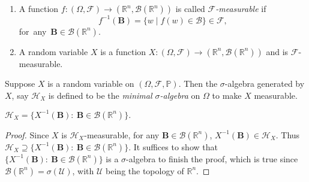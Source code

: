 \begin{definition}
\begin{enumerate}
\item
A function $f:(\Omega,\mathcal{F})\to(\mathbb{R}^n,\mathcal{B}(\mathbb{R}^n))$ is called \emph{$\mathcal{F}$-measurable} if
\[
f^{-1}(\bm B)=\{w\mid f(w)\in\mathcal{B}\}\in\mathcal{F},
\]
\mbox{for any $\bm B\in\mathcal{B}(\mathbb{R}^n)$.}
\item
A random variable $X$ is a function $X:(\Omega,\mathcal{F})\to(\mathbb{R}^n,\mathcal{B}(\mathbb{R}^n))$ and is $\mathcal{F}$-measurable.
\end{enumerate}
\end{definition}

\begin{definition}
Suppose $X$ is a random variable on $(\Omega,\mathcal{F},\mathbb{P})$. 
Then the $\sigma$-algebra generated by $X$, say $\mathcal{H}_X$ is defined to be 
the \emph{minimal $\sigma$-algebra} on $\Omega$ to make $X$ measurable.
\end{definition}
\begin{proposition}
$
\mathcal{H}_X = \{X^{-1}(\bm B):~\bm B\in\mathcal{B}(\mathbb{R}^n)\}.
$
\end{proposition}

\begin{proof}
Since $X$ is $\mathcal{H}_X$-measurable, for any $\bm B\in\mathcal{B}(\mathbb{R}^n)$, $X^{-1}(\bm B)\in\mathcal{H}_X$. Thus $\mathcal{H}_X \supseteq \{X^{-1}(\bm B):~\bm B\in\mathcal{B}(\mathbb{R}^n)\}$.
It suffices to show that $\{X^{-1}(\bm B):~\bm B\in\mathcal{B}(\mathbb{R}^n)\}$ is a $\sigma$-algebra to finish the proof, which is true since $\mathcal{B}(\mathbb{R}^n)=\sigma(\mathcal{U})$, with $\mathcal{U}$ being the topology of $\mathbb{R}^n$.



\end{proof}


















